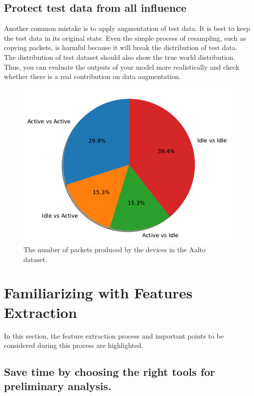 \documentclass[journal]{IEEEtran}
\begin{document}
\subsection{Protect test data from all influence}
Another common mistake is to apply augmentation of test data. It is best to keep the test data in its original state. Even the simple process of resampling, such as copying packets, is harmful because it will break the distribution of test data. The distribution of  test dataset should also show the true world distribution. Thus, you can evaluate the outputs of your model more realistically and check whether there is a real contribution on data augmentation.

\begin{figure}[ht]
	\centerline{\includegraphics[width=1\columnwidth]{images/pie.pdf}}
	\caption{The number of packets produced by the devices in the Aalto dataset.}
	\label{fig:aalto}
\end{figure}




\section{Familiarizing with Features Extraction}\label{section:Features}
In this section, the feature extraction process and important points to be considered during this process are highlighted.

\subsection{Save time by choosing the right tools for preliminary analysis.}
\end{document}
